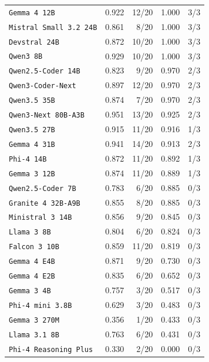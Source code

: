 \begin{table}[p]
\begin{tabular}{lrrrr}
\texttt{Gemma 4 12B} & 0.922 & 12/20 & 1.000 & 3/3 \\
\texttt{Mistral Small 3.2 24B} & 0.861 & 8/20 & 1.000 & 3/3 \\
\texttt{Devstral 24B} & 0.872 & 10/20 & 1.000 & 3/3 \\
\texttt{Qwen3 8B} & 0.929 & 10/20 & 1.000 & 3/3 \\
\texttt{Qwen2.5-Coder 14B} & 0.823 & 9/20 & 0.970 & 2/3 \\
\texttt{Qwen3-Coder-Next} & 0.897 & 12/20 & 0.970 & 2/3 \\
\texttt{Qwen3.5 35B} & 0.874 & 7/20 & 0.970 & 2/3 \\
\texttt{Qwen3-Next 80B-A3B} & 0.951 & 13/20 & 0.925 & 2/3 \\
\texttt{Qwen3.5 27B} & 0.915 & 11/20 & 0.916 & 1/3 \\
\texttt{Gemma 4 31B} & 0.941 & 14/20 & 0.913 & 2/3 \\
\texttt{Phi-4 14B} & 0.872 & 11/20 & 0.892 & 1/3 \\
\texttt{Gemma 3 12B} & 0.874 & 11/20 & 0.889 & 1/3 \\
\texttt{Qwen2.5-Coder 7B} & 0.783 & 6/20 & 0.885 & 0/3 \\
\texttt{Granite 4 32B-A9B} & 0.855 & 8/20 & 0.885 & 0/3 \\
\texttt{Ministral 3 14B} & 0.856 & 9/20 & 0.845 & 0/3 \\
\texttt{Llama 3 8B} & 0.804 & 6/20 & 0.824 & 0/3 \\
\texttt{Falcon 3 10B} & 0.859 & 11/20 & 0.819 & 0/3 \\
\texttt{Gemma 4 E4B} & 0.871 & 9/20 & 0.730 & 0/3 \\
\texttt{Gemma 4 E2B} & 0.835 & 6/20 & 0.652 & 0/3 \\
\texttt{Gemma 3 4B} & 0.757 & 3/20 & 0.517 & 0/3 \\
\texttt{Phi-4 mini 3.8B} & 0.629 & 3/20 & 0.483 & 0/3 \\
\texttt{Gemma 3 270M} & 0.356 & 1/20 & 0.433 & 0/3 \\
\texttt{Llama 3.1 8B} & 0.763 & 6/20 & 0.431 & 0/3 \\
\texttt{Phi-4 Reasoning Plus} & 0.330 & 2/20 & 0.000 & 0/3 \\
\bottomrule
\end{tabular}
\end{table}
